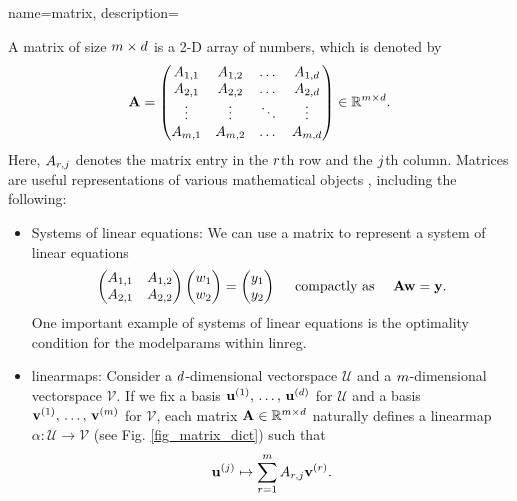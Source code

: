 {name={matrix},
	description={A matrix of size $m \times d$ is a 2-D array of numbers, 
 		which is denoted by 
		$$
  		{\bf A} = \begin{pmatrix}
   		A_{1,1} & A_{1,2} & \dots  & A_{1,d} \\
		A_{2,1} & A_{2,2} & \dots  & A_{2,d} \\
		\vdots  & \vdots  & \ddots & \vdots \\
		A_{m,1} & A_{m,2} & \dots  & A_{m,d}
		\end{pmatrix} \in \mathbb{R}^{m \times d}.
		$$
		Here, $A_{r,j}$ denotes the matrix entry in the $r$th row and the 
		$j$th column. Matrices are useful representations of various mathematical objects \cite{StrangLinAlg2016},
		including the following:
		\begin{itemize}
			\item Systems of linear equations: We can use a matrix to represent a system of linear equations 
			$$ \begin{pmatrix}
			A_{1,1} & A_{1,2} \\
			A_{2,1} & A_{2,2}
			\end{pmatrix}
			\begin{pmatrix}
				w_1 \\
				w_2
			\end{pmatrix}
			=\begin{pmatrix}
				y_1 \\
				y_2
			\end{pmatrix}
			\quad \text{ compactly as } \quad {\bf A} {\bf w} = {\bf y}.
			$$
    			One important example of systems of linear equations is the optimality condition for the 
    			\glspl{modelparam} within \gls{linreg}. 
			\item \Glspl{linearmap}:
			Consider a $d$-dimensional \gls{vectorspace} $\mathcal{U}$ and a $m$-dimensional \gls{vectorspace} $\mathcal{V}$. 
			If we fix a basis $\mathbf{u}^{(1)},\,\ldots,\,\mathbf{u}^{(d)}$ for $\mathcal{U}$ and a basis $\mathbf{v}^{(1)},\,\ldots,\,\mathbf{v}^{(m)}$ 
			for $\mathcal{V}$, each matrix ${\bf A} \in \mathbb{R}^{m \times d}$ naturally defines a 
			\gls{linearmap} $\alpha: \mathcal{U} \rightarrow \mathcal{V}$ (see Fig. \ref{fig_matrix_dict}) such that
   			$${\bf u}^{(j)} \mapsto \sum_{r=1}^{m} A_{r,j} {\bf v}^{(r)}.$$

\end{itemize}}}
